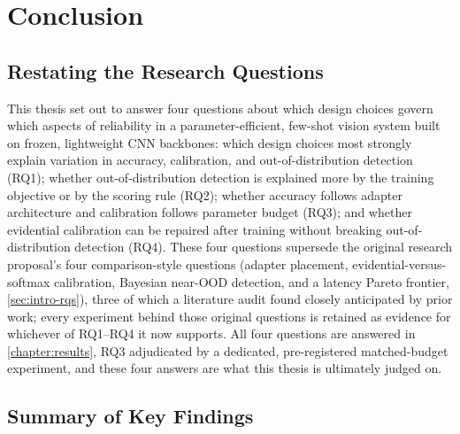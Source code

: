 \documentclass{iutbscthesis}
\begin{document}
\chapter{Conclusion}
\label{chapter:conclusion}

\section{Restating the Research Questions}

This thesis set out to answer four questions about which design choices govern which aspects of reliability in a parameter-efficient, few-shot vision system built on frozen, lightweight CNN backbones: which design choices most strongly explain variation in accuracy, calibration, and out-of-distribution detection (RQ1); whether out-of-distribution detection is explained more by the training objective or by the scoring rule (RQ2); whether accuracy follows adapter architecture and calibration follows parameter budget (RQ3); and whether evidential calibration can be repaired after training without breaking out-of-distribution detection (RQ4). These four questions supersede the original research proposal's four comparison-style questions (adapter placement, evidential-versus-softmax calibration, Bayesian near-OOD detection, and a latency Pareto frontier, \autoref{sec:intro-rqs}), three of which a literature audit found closely anticipated by prior work; every experiment behind those original questions is retained as evidence for whichever of RQ1--RQ4 it now supports. All four questions are answered in \autoref{chapter:results}, RQ3 adjudicated by a dedicated, pre-registered matched-budget experiment, and these four answers are what this thesis is ultimately judged on.

\section{Summary of Key Findings}
\end{document}
